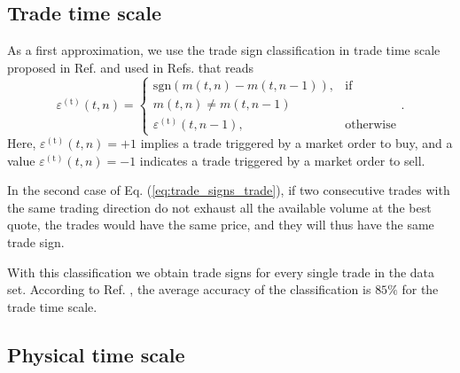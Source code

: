 \subsection{Trade time scale}\label{subsec:trade_time}

As a first approximation, we use the trade sign classification in trade time
scale proposed in Ref. \cite{Wang_2016_cross} and used in Refs.
\cite{my_paper_response_financial,Wang_2016_avg,Wang_2017,Wang_2018_copulas}
that reads
\begin{equation}\label{eq:trade_signs_trade}
    \varepsilon^{\left(\textrm{t}\right)}\left(t,n\right)=\left\{
    \begin{array}{cc}
    \text{sgn}\left(m\left(t,n\right)-m\left(t,n-1\right)\right),
    & \text{if }\\ m\left(t,n\right) \ne m\left(t,n-1\right)\\
    \varepsilon^{\left(\textrm{t}\right)}\left(t,n-1\right),
    & \text{otherwise}
    \end{array}\right..
\end{equation}
Here, $\varepsilon^{\left(\textrm{t}\right)}\left( t,n \right) = +1$ implies a
trade triggered by a market order to buy, and a value
$\varepsilon^{\left(\textrm{t}\right)}\left( t,n \right) = -1$ indicates a trade
triggered by a market order to sell.

In the second case of Eq. (\ref{eq:trade_signs_trade}), if two consecutive
trades with the same trading direction do not exhaust all the available volume
at the best quote, the trades would have the same price, and they will thus
have the same trade sign.

With this classification we obtain trade signs for every single trade in the
data set. According to Ref. \cite{Wang_2016_cross}, the average accuracy of the
classification is $85\%$ for the trade time scale.

\subsection{Physical time scale}\label{subsec:physical_time}

